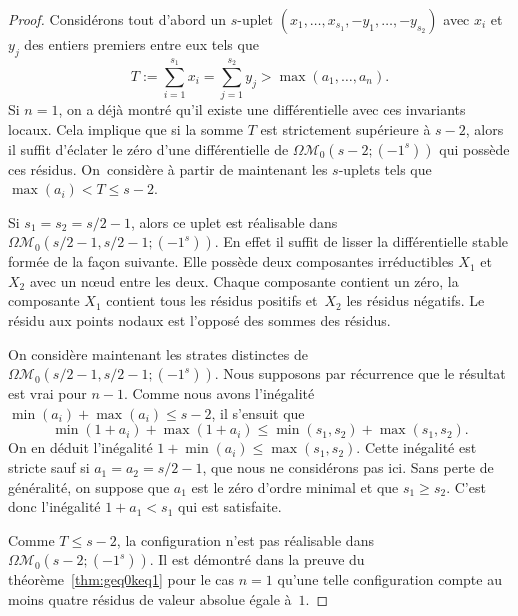 \documentclass[11pt]{article}
\numberwithin{equation}{section}\renewcommand{\proofname}{Démonstration}
\let\mathcal\mathscr
\newcommand{\omoduli}[1][g]{{\Omega\mathcal M}_{\!#1}}
\theoremstyle{definition}
\begin{document}
\begin{proof}
Considérons tout d'abord un $s$-uplet $(x_{1},\dots,x_{s_{1}},-y_{1},\dots,-y_{s_{2}})$ avec $x_{i}$ et $y_{j}$ des entiers premiers entre eux tels que\vspace*{-3pt}\enlargethispage{.5\baselineskip}%
\[
T:=\sum_{i=1}^{s_{1}} x_{i} = \sum_{j=1}^{s_{2}} y_{j} > \max(a_{1},\dots,a_{n}).
\]
Si $n=1$, on a déjà montré qu'il existe une différentielle avec ces invariants locaux. Cela implique que si la somme $T$ est strictement supérieure à $s-2$, alors il suffit d'éclater le zéro d'une différentielle de $\omoduli[0](s-2;(-1^{s}))$ qui possède ces résidus. On~considère à partir de maintenant les $s$-uplets tels que $\max(a_{i}) < T \leq s-2$.

Si $s_{1}=s_{2}=s/2-1$, alors ce uplet est réalisable dans $\omoduli[0](s/2-1, s/2-1;(-1^{s}))$. En effet il suffit de lisser la différentielle stable formée de la façon suivante. Elle possède deux composantes irréductibles $X_{1}$ et~$X_{2}$ avec un nœud entre les deux. Chaque composante contient un zéro, la composante $X_{1}$ contient tous les résidus positifs et~$X_{2}$ les résidus négatifs. Le résidu aux points nodaux est l'opposé des sommes des résidus.

On considère maintenant les strates distinctes de $\omoduli[0](s/2-1, s/2-1;(-1^{s}))$. Nous supposons par récurrence que le résultat est vrai pour $n-1$. Comme nous avons l'inégalité $\min(a_{i})+\max(a_{i}) \leq s-2$, il s'ensuit que\vspace*{-3pt}
\[
\min(1+a_{i})+\max(1+a_{i}) \leq \min(s_{1},s_{2})+\max(s_{1},s_{2}).
\]
On en déduit l'inégalité $1 + \min(a_{i}) \leq \max (s_{1},s_{2})$. Cette inégalité est stricte sauf si $a_{1}=a_{2}=s/2-1$, que nous ne considérons pas ici. Sans perte de généralité, on suppose que $a_{1}$ est le zéro d’ordre minimal et que $s_{1}\geq s_{2}$. C'est donc l'inégalité $1 + a_1 < s_{1}$ qui est satisfaite.

Comme $T \leq s-2$, la configuration n'est pas réalisable dans $\omoduli[0](s-2;(-1^{s}))$. Il est démontré dans la preuve du théorème~\ref{thm:geq0keq1} pour le cas $n=1$ qu'une telle configuration compte au moins quatre résidus de valeur absolue égale à~$1$.


\end{proof}
\end{document}
